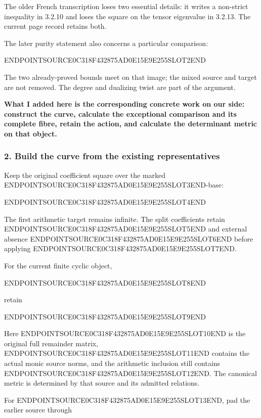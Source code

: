 The older French transcription loses two essential details: it writes a non-strict inequality in 3.2.10 and loses the square on the tensor eigenvalue in 3.2.13. The current page record retains both.

The later purity statement also concerns a particular comparison:

ENDPOINTSOURCE0C318F432875AD0E15E9E255SLOT2END

The two already-proved bounds meet on that image; the mixed source and target are not removed. The degree and dualizing twist are part of the argument.

\textbf{What I added here is the corresponding concrete work on our side: construct the curve, calculate the exceptional comparison and its complete fibre, retain the action, and calculate the determinant metric on that object.}

\subsubsection{2. Build the curve from the existing representatives}\label{endpoint-curvature_original--build-the-curve-from-the-existing-representatives}

Keep the original coefficient square over the marked ENDPOINTSOURCE0C318F432875AD0E15E9E255SLOT3END-base:

ENDPOINTSOURCE0C318F432875AD0E15E9E255SLOT4END

The first arithmetic target remains infinite. The split coefficients retain ENDPOINTSOURCE0C318F432875AD0E15E9E255SLOT5END and external absence ENDPOINTSOURCE0C318F432875AD0E15E9E255SLOT6END before applying ENDPOINTSOURCE0C318F432875AD0E15E9E255SLOT7END.

For the current finite cyclic object,

ENDPOINTSOURCE0C318F432875AD0E15E9E255SLOT8END

retain

ENDPOINTSOURCE0C318F432875AD0E15E9E255SLOT9END

Here ENDPOINTSOURCE0C318F432875AD0E15E9E255SLOT10END is the original full remainder matrix, ENDPOINTSOURCE0C318F432875AD0E15E9E255SLOT11END contains the actual monic source norms, and the arithmetic inclusion still contains ENDPOINTSOURCE0C318F432875AD0E15E9E255SLOT12END. The canonical metric is determined by that source and its admitted relations.

For ENDPOINTSOURCE0C318F432875AD0E15E9E255SLOT13END, pad the earlier source through

